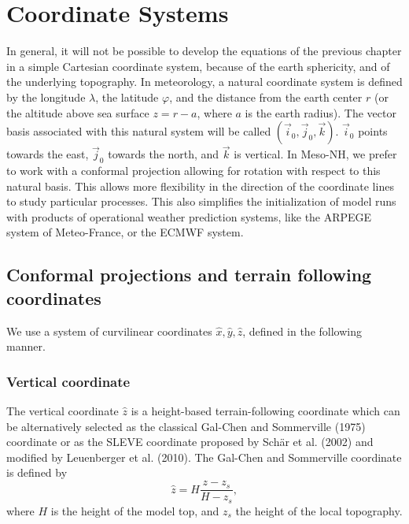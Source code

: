 
\chapter{Coordinate Systems}
\minitoc
 

In general, it will not be possible to develop the equations of the previous
chapter in a simple Cartesian coordinate system, because
of the earth sphericity, and of the underlying topography.
In meteorology, a natural coordinate system is defined by the longitude
$\lambda$, the latitude $\varphi$, and the distance from the earth center $r$
(or the altitude above sea surface $z=r-a$, where $a$ is the earth radius).
The vector basis associated with this natural system will be called
$(\vec{i}_0, \vec{j}_0,\vec{k})$. $\vec{i}_0$ points towards the east,
$\vec{j}_0$ towards the north, and $\vec{k}$ is vertical.
In Meso-NH, we prefer to work with a conformal
projection allowing for rotation with respect to this natural basis.
This allows more flexibility in the direction of the coordinate lines
to study particular processes. This also simplifies the initialization
of model runs with products of operational weather prediction systems,
like the ARPEGE system of Meteo-France, or the ECMWF system.

\section{Conformal projections and terrain following coordinates}

We use a system of curvilinear coordinates $\widehat{x},\widehat{y},
\widehat{z}$, defined in the following manner.

\subsection{Vertical coordinate}
The vertical coordinate $\hat z$ is a height-based 
terrain-following coordinate which can be alternatively selected as 
the classical Gal-Chen and Sommerville (1975) coordinate or as the 
SLEVE coordinate proposed by Sch\"ar et al. (2002)
and modified by Leuenberger et al. (2010).   
The Gal-Chen and Sommerville coordinate is defined by 
\begin{equation}
\hat z = H \frac{z-z_s}{H-z_s},
\end{equation}
where $H$ is the height of the model top, and $z_s$ the height of the local
topography.

